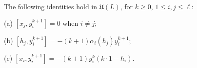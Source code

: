 The following identities hold in $\mathfrak{U}(L)$, for $k \geq 0$, $1 \leq i, j \leq \ell$:

(a) $[x_j, y_i^{k+1}] = 0$ when $i \neq j$;

(b) $[h_j, y_i^{k+1}] = -(k+1)\alpha_i(h_j)y_i^{k+1}$;

(c) $[x_i, y_i^{k+1}] = -(k+1)y_i^k(k \cdot 1 - h_i)$.
